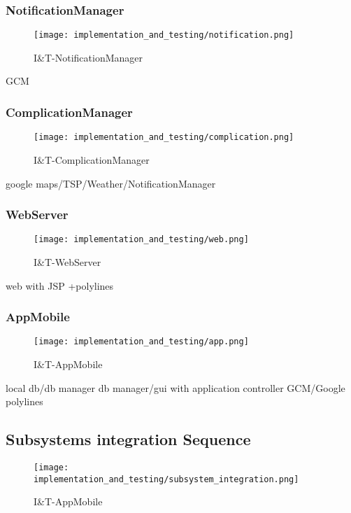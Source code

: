 \subsubsection{NotificationManager}
\begin{figure}[H]
	\begin{center}
		\texttt{[image: implementation\_and\_testing/notification.png]}
	\end{center}
	\caption{I\&T-NotificationManager}
\end{figure}
GCM

\subsubsection{ComplicationManager}
\begin{figure}[H]
	\begin{center}
		\texttt{[image: implementation\_and\_testing/complication.png]}
	\end{center}
	\caption{I\&T-ComplicationManager}
\end{figure}
google maps/TSP/Weather/NotificationManager

\subsubsection{WebServer}
\begin{figure}[H]
	\begin{center}
		\texttt{[image: implementation\_and\_testing/web.png]}
	\end{center}
	\caption{I\&T-WebServer}
\end{figure}
web with JSP +polylines

\subsubsection{AppMobile}
\begin{figure}[H]
	\begin{center}
		\texttt{[image: implementation\_and\_testing/app.png]}
	\end{center}
	\caption{I\&T-AppMobile}
\end{figure}
local db/db manager
db manager/gui with application controller
GCM/Google polylines

\subsection{Subsystems integration Sequence}
\begin{figure}[H]
	\begin{center}
		\texttt{[image: implementation\_and\_testing/subsystem\_integration.png]}
	\end{center}
	\caption{I\&T-AppMobile}
\end{figure}